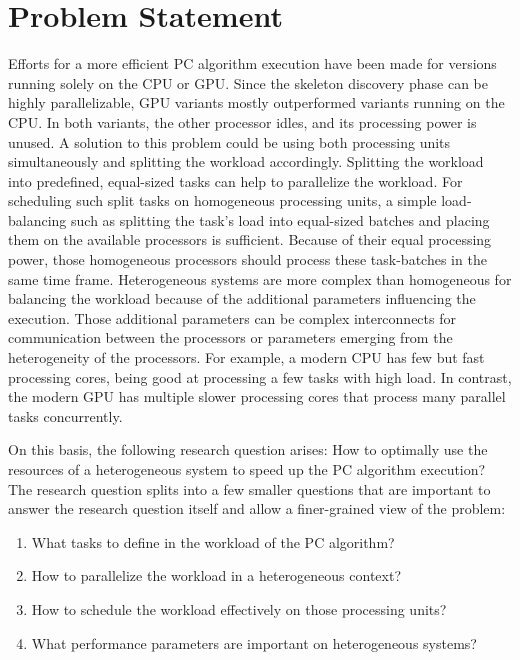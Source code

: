 \chapter{Problem Statement}
\label{chap:problem_statement}
Efforts for a more efficient PC algorithm execution have been made for versions running solely on the CPU or GPU. Since the skeleton discovery phase can be highly parallelizable, GPU variants mostly outperformed variants running on the CPU. In both variants, the other processor idles, and its processing power is unused. A solution to this problem could be using both processing units simultaneously and splitting the workload accordingly.
Splitting the workload into predefined, equal-sized tasks can help to parallelize the workload. For scheduling such split tasks on homogeneous processing units, a simple load-balancing such as splitting the task's load into equal-sized batches and placing them on the available processors is sufficient.
Because of their equal processing power, those homogeneous processors should process these task-batches in the same time frame.
Heterogeneous systems are more complex than homogeneous for balancing the workload because of the additional parameters influencing the execution. Those additional parameters can be complex interconnects for communication between the processors or parameters emerging from the heterogeneity of the processors. For example, a modern CPU has few but fast processing cores, being good at processing a few tasks with high load. In contrast, the modern GPU has multiple slower processing cores that process many parallel tasks concurrently.

On this basis, the following research question arises: How to optimally use the resources of a heterogeneous system to speed up the PC algorithm execution?
The research question splits into a few smaller questions that are important to answer the research question itself and allow a finer-grained view of the problem:

\begin{enumerate}
  \item What tasks to define in the workload of the PC algorithm?
  \item How to parallelize the workload in a heterogeneous context?
  \item How to schedule the workload effectively on those processing units?
  \item What performance parameters are important on heterogeneous systems?
\end{enumerate}

